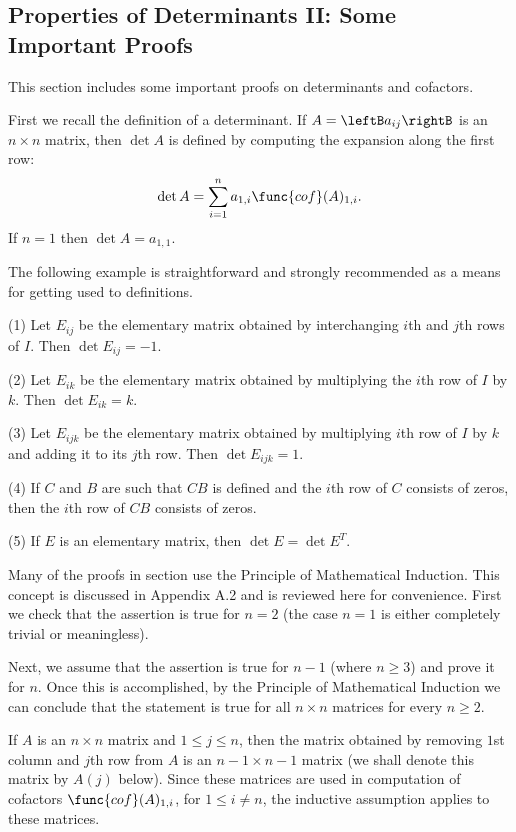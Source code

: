 \subsection{Properties of Determinants II: Some Important Proofs } \label{sec:determinantproofs}

This section includes some important proofs on determinants and cofactors.

First we recall the definition of a determinant. If $A=\leftB a_{ij} \rightB$ is an $n\times n$ matrix, then $\det A$ is defined by computing the expansion along the first row:
\begin{equation}
\label{E1} 
\det A=\sum_{i=1}^n a_{1,i} \func{cof}(A)_{1,i}. 
\end{equation}
If $n=1$ then $\det A=a_{1,1}$. 

The following example is straightforward and strongly recommended as a means for
getting used to definitions. 

\begin{example}{}\label{exa:EX1}
(1) Let $E_{ij}$ be the elementary matrix obtained by interchanging $i$th and $j$th rows of $I$. 
Then $\det E_{ij}=-1$. 

(2) Let $E_{ik}$ be the elementary matrix obtained by multiplying the $i$th row of $I$ by $k$. 
Then $\det E_{ik}=k$. 

(3) Let $E_{ijk}$ be the elementary matrix obtained by multiplying $i$th row of $I$ by $k$ and 
adding it to its $j$th row. Then $\det E_{ijk}=1$. 

(4) If $C$ and $B$ are such that $CB$ is defined and the $i$th row of $C$ consists of zeros, 
then the $i$th row of $CB$ consists of zeros. 

(5) If $E$ is an elementary matrix, then $\det E=\det E^T$. 
\end{example} 

Many of the proofs in section use the Principle of Mathematical Induction. This concept is discussed in Appendix A.2 and is reviewed here for convenience.
First we check that the assertion is true for $n=2$ (the case $n=1$ is either completely trivial
or meaningless). 

Next, we assume that the assertion is true for $n-1$ (where $n\geq 3$) and prove it for $n$. 
Once this is accomplished, by the Principle of Mathematical Induction we can conclude that the 
statement is true for all $n\times n$ matrices for every $n\geq 2$. 

If $A$ is an $n\times n$ matrix and $1\leq j \leq n$,
then the matrix obtained by removing $1$st column and $j$th row from $A$ 
is an $n-1\times n-1$ matrix (we shall denote this matrix by $A(j)$ below). Since these matrices 
are used in computation of cofactors $\func{cof}(A)_{1,i}$, for $1\leq i\neq n$, 
the inductive assumption applies to these matrices. 

